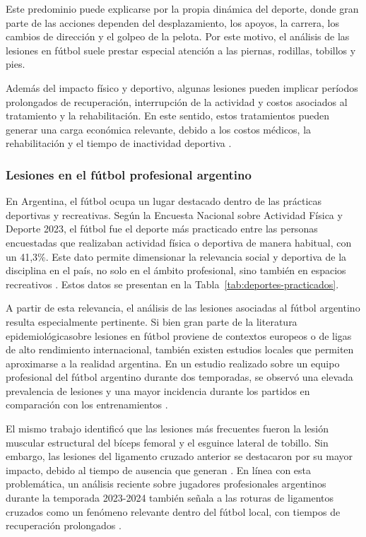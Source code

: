 Este predominio puede explicarse por la propia dinámica del deporte, donde gran parte de las acciones dependen del desplazamiento, los apoyos, 
la carrera, los cambios de dirección y el golpeo de la pelota. Por este motivo, el análisis de las lesiones en fútbol suele prestar especial 
atención a las piernas, rodillas, tobillos y pies.

Además del impacto físico y deportivo, algunas lesiones pueden implicar períodos prolongados de recuperación, interrupción de la actividad 
y costos asociados al tratamiento y la rehabilitación. En este sentido, estos tratamientos pueden generar una carga económica relevante,
debido a los costos médicos, la rehabilitación y el tiempo de inactividad deportiva \parencite{RossEtAl2023}.

\subsubsection{Lesiones en el fútbol profesional argentino}

En Argentina, el fútbol ocupa un lugar destacado dentro de las prácticas deportivas y recreativas.
Según la Encuesta Nacional sobre Actividad Física y Deporte 2023, el fútbol fue el deporte más
practicado entre las personas encuestadas que realizaban actividad física o deportiva de manera
habitual, con un 41,3\%. Este dato permite dimensionar la relevancia social y deportiva de la
disciplina en el país, no solo en el ámbito profesional, sino también en espacios recreativos
\parencite{ObservatorioSocialDeporte2023}. Estos datos se presentan en la Tabla~\ref{tab:deportes-practicados}.

A partir de esta relevancia, el análisis de las lesiones asociadas al fútbol argentino resulta
especialmente pertinente. Si bien gran parte de la literatura epidemiológica\footnotemark sobre lesiones en
fútbol proviene de contextos europeos o de ligas de alto rendimiento internacional, también existen
estudios locales que permiten aproximarse a la realidad argentina. En un estudio realizado sobre
un equipo profesional del fútbol argentino durante dos temporadas, se observó una elevada
prevalencia de lesiones y una mayor incidencia durante los partidos en comparación con los
entrenamientos \parencite{BaldjianEtAl2022}.

El mismo trabajo identificó que las lesiones más frecuentes fueron la lesión muscular estructural
del bíceps femoral y el esguince lateral de tobillo. Sin embargo, las lesiones del ligamento
cruzado anterior se destacaron por su mayor impacto, debido al tiempo de ausencia que generan
\parencite{BaldjianEtAl2022}. En línea con esta problemática, un análisis reciente sobre jugadores
profesionales argentinos durante la temporada 2023-2024 también señala a las roturas de ligamentos
cruzados como un fenómeno relevante dentro del fútbol local, con tiempos de recuperación
prolongados \parencite{BaezBanegasEtAl2024}.

